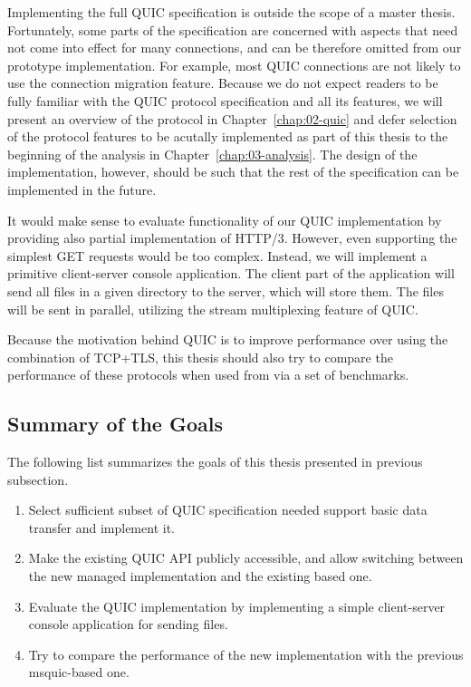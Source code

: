 Implementing the full QUIC specification is outside the scope of a master thesis. Fortunately, some
parts of the specification are concerned with aspects that need not come into effect for many
connections, and can be therefore omitted from our prototype implementation. For example, most QUIC
connections are not likely to use the connection migration feature. Because we do not expect readers
to be fully familiar with the QUIC protocol specification and all its features, we will present an
overview of the protocol in Chapter~\ref{chap:02-quic} and defer selection of the protocol features
to be acutally implemented as part of this thesis to the beginning of the analysis in
Chapter~\ref{chap:03-analysis}. The design of the implementation, however, should be such that the
rest of the specification can be implemented in the future.

It would make sense to evaluate functionality of our QUIC implementation by providing also partial
implementation of HTTP/3. However, even supporting the simplest GET requests would be too
complex. Instead, we will implement a primitive client-server console application. The client part
of the application will send all files in a given directory to the server, which will store them.
The files will be sent in parallel, utilizing the stream multiplexing feature of QUIC\@.

Because the motivation behind QUIC is to improve performance over using the combination of TCP+TLS,
this thesis should also try to compare the performance of these protocols when used from \dotnet{}
via a set of benchmarks.

\subsection*{Summary of the Goals}

The following list summarizes the goals of this thesis presented in previous subsection.

\begin{enumerate}
  \item Select sufficient subset of QUIC specification needed support basic data transfer and
    implement it.

  \item Make the existing QUIC API publicly accessible, and allow switching between the new managed
    implementation and the existing \libmsquic{} based one.

  \item Evaluate the QUIC implementation by implementing a simple client-server console application
    for sending files.

  \item Try to compare the performance of the new implementation with the previous msquic-based one.

\end{enumerate}
